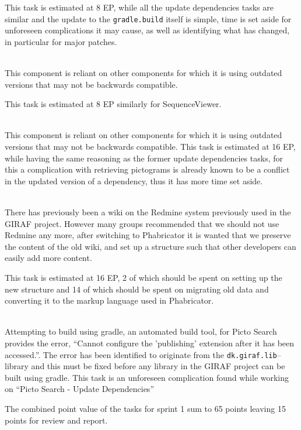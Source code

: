 \begin{description}[style=unboxed]
        This task is estimated at 8 EP, while all the update dependencies tasks are similar and the update to the \texttt{gradle.build} itself is simple, time is set aside for unforeseen complications it may cause, as well as identifying what has changed, in particular for major patches.
    \item[{[}HIGH{]} Sequence - Update dependencies] \hfill \\ 
        This component is reliant on other components for which it is using outdated versions that may not be backwards compatible.

        This task is estimated at 8 EP similarly for SequenceViewer.
    \item[{[}HIGH{]} Picto Search - Update dependencies] \hfill \\
        This component is reliant on other components for which it is using outdated versions that may not be backwards compatible.
        This task is estimated at 16 EP, while having the same reasoning as the former update dependencies tasks, for this a complication with retrieving pictograms is already known to be a conflict in the updated version of a dependency, thus it has more time set aside.
    \item[{[}HIGH{]} Wiki - Setup new structure and migrate to Phabricator] \hfill \\
        There has previously been a wiki on the Redmine system previously used in the GIRAF project. 
        However many groups recommended that we should not use Redmine any more, after switching to Phabricator it is wanted that we preserve the content of the old wiki, and set up a structure such that other developers can easily add more content.

        This task is estimated at 16 EP, 2 of which should be spent on setting up the new structure and 14 of which should be spent on migrating old data and converting it to the markup language used in Phabricator. 
    \item[{[}UNBREAK NOW!{]} Gradle - Custom plug-in dk.giraf.lib for gradle breaks build] \hfill \\
        Attempting to build using gradle, an automated build tool, for Picto Search provides the error, ``Cannot configure the 'publishing' extension after it has been accessed.''. 
        The error has been identified to originate from the \texttt{dk.giraf.lib}--library and this must be fixed before any library in the GIRAF project can be built using gradle. 
        This task is an unforeseen complication found while working on ``Picto Search - Update Dependencies''
\end{description}
The combined point value of the tasks for sprint 1 sum to 65 points leaving 15 points for review and report.

